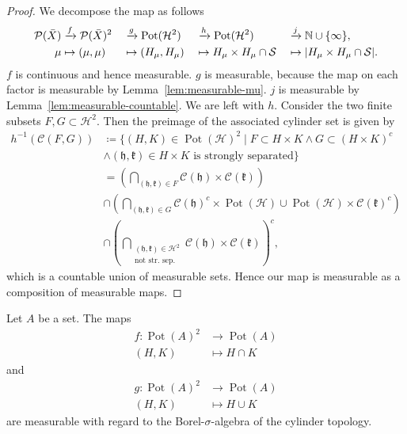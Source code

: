 \begin{proof}
  We decompose the map as follows
  \begin{alignat*}{4}
    \mathcal{P}(\bar X) &\xrightarrow{f} \mathcal{P}(\bar X)^2&&\xrightarrow{g} \operatorname{Pot}(\mathcal{H}^2) &&\xrightarrow{h} \operatorname{Pot}(\mathcal{H}^2) &&\xrightarrow{j} \mathbb{N} \cup \{\infty\},\\
    \mu &\mapsto (\mu, \mu) &&\mapsto (H_\mu, H_\mu)&&\mapsto H_\mu \times H_\mu \cap \mathcal{S} &&\mapsto |H_\mu \times H_\mu \cap \mathcal{S}|.
  \end{alignat*}
  \(f\) is continuous and hence measurable. \(g\) is measurable, because the map on each factor is measurable by Lemma~\ref{lem:measurable-mu}. \(j\) is measurable by Lemma~\ref{lem:measurable-countable}. We are left with \(h\). Consider the two finite subsets \(F, G \subset \mathcal{H}^2\). Then the preimage of the associated cylinder set is given by
  \begin{align*}
    h^{-1}(\mathcal{C}(F,G)) & \coloneqq \{(H, K) \in \operatorname{Pot}(\mathcal{H})^2 \mid F \subset H \times K \wedge G \subset (H \times K)^c\\
    & \wedge (\mathfrak{h}, \mathfrak{k}) \in H \times K \text{ is strongly separated}\}\\
      & = \left (\bigcap_{(\mathfrak{h},\mathfrak{k}) \in F} \mathcal{C}(\mathfrak{h}) \times \mathcal{C}(\mathfrak{k})\right)\\
      & \cap \left (\bigcap_{(\mathfrak{h},\mathfrak{k}) \in G} \mathcal{C}(\mathfrak{h})^c \times \operatorname{Pot}(\mathcal{H}) \cup \operatorname{Pot}(\mathcal{H}) \times \mathcal{C}(\mathfrak{k})^c \right)\\
      & \cap \left( \bigcap_{\substack{(\mathfrak{h}, \mathfrak{k}) \in \mathcal{H}^2\\\text{not str.\ sep.}}} \mathcal{C}(\mathfrak{h}) \times \mathcal{C}(\mathfrak{k})\right)^c,
  \end{align*}
  which is a countable union of measurable sets. Hence our map is measurable as a composition of measurable maps.
\end{proof}

\begin{lemma}
  Let \(A\) be a set. The maps
  \begin{align*}
    f \colon \operatorname{Pot}(A)^2 & \to \operatorname{Pot}(A)\\
    (H, K) & \mapsto H \cap K
  \end{align*}
  and
  \begin{align*}
    g \colon \operatorname{Pot}(A)^2 & \to \operatorname{Pot}(A)\\
    (H, K) & \mapsto H \cup K
  \end{align*}
  are measurable with regard to the Borel-\(\sigma\)-algebra of the cylinder topology.
\end{lemma}

